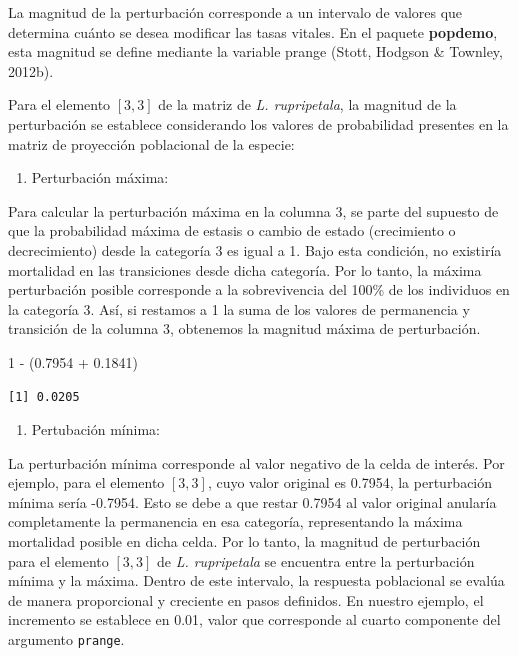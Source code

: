 \documentclass[
  12pt,
  letterpaper,
]{book}
\newenvironment{Shaded}{\begin{snugshade}}{\end{snugshade}}
\newcommand{\DecValTok}[1]{\textcolor[rgb]{0.68,0.00,0.00}{#1}}
\newcommand{\FloatTok}[1]{\textcolor[rgb]{0.68,0.00,0.00}{#1}}
\newcommand{\NormalTok}[1]{\textcolor[rgb]{0.00,0.23,0.31}{#1}}
\newcommand{\SpecialCharTok}[1]{\textcolor[rgb]{0.37,0.37,0.37}{#1}}
\providecommand{\tightlist}{%
  \setlength{\itemsep}{0pt}\setlength{\parskip}{0pt}}\usepackage{longtable,booktabs,array}
\begin{document}
La magnitud de la perturbación corresponde a un intervalo de valores que
determina cuánto se desea modificar las tasas vitales. En el paquete
\textbf{popdemo}, esta magnitud se define mediante la variable prange
(Stott, Hodgson \& Townley, 2012b).

Para el elemento \([3,3]\) de la matriz de \emph{L. rupripetala}, la
magnitud de la perturbación se establece considerando los valores de
probabilidad presentes en la matriz de proyección poblacional de la
especie:

\begin{enumerate}
\def\labelenumi{\roman{enumi})}
\tightlist
\item
  Perturbación máxima:
\end{enumerate}

Para calcular la perturbación máxima en la columna 3, se parte del
supuesto de que la probabilidad máxima de estasis o cambio de estado
(crecimiento o decrecimiento) desde la categoría 3 es igual a 1. Bajo
esta condición, no existiría mortalidad en las transiciones desde dicha
categoría. Por lo tanto, la máxima perturbación posible corresponde a la
sobrevivencia del 100\% de los individuos en la categoría 3. Así, si
restamos a 1 la suma de los valores de permanencia y transición de la
columna 3, obtenemos la magnitud máxima de perturbación.

\begin{Shaded}
\begin{Highlighting}[]
\DecValTok{1} \SpecialCharTok{{-}}\NormalTok{ (}\FloatTok{0.7954} \SpecialCharTok{+} \FloatTok{0.1841}\NormalTok{)}
\end{Highlighting}
\end{Shaded}

\begin{verbatim}
[1] 0.0205
\end{verbatim}

\begin{enumerate}
\def\labelenumi{\roman{enumi})}
\setcounter{enumi}{1}
\tightlist
\item
  Pertubación mínima:
\end{enumerate}

La perturbación mínima corresponde al valor negativo de la celda de
interés. Por ejemplo, para el elemento \([3,3]\), cuyo valor original es
0.7954, la perturbación mínima sería -0.7954. Esto se debe a que restar
0.7954 al valor original anularía completamente la permanencia en esa
categoría, representando la máxima mortalidad posible en dicha celda.
Por lo tanto, la magnitud de perturbación para el elemento \([3,3]\) de
\emph{L. rupripetala} se encuentra entre la perturbación mínima y la
máxima. Dentro de este intervalo, la respuesta poblacional se evalúa de
manera proporcional y creciente en pasos definidos. En nuestro ejemplo,
el incremento se establece en 0.01, valor que corresponde al cuarto
componente del argumento \texttt{prange}.
\end{document}
